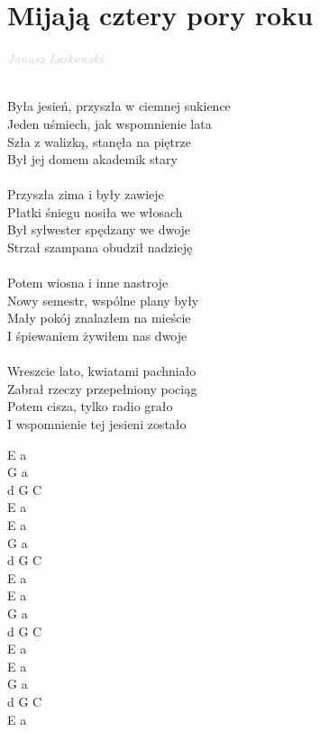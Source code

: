 \documentclass[a5paper, 10pt]{book}
\begin{document}
\newpage
\section{Mijają cztery pory roku}\textcolor{lightgray}{\textit{Janusz Laskowski}}\\~\\
\begin{minipage}[t]{0.8\textwidth}
Była jesień, przyszła w ciemnej sukience\\
Jeden uśmiech, jak wspomnienie lata\\
\hspace*{5mm}Szła z walizką, stanęła na piętrze\\
\hspace*{5mm}Był jej domem akademik stary\\
\\
Przyszła zima i były zawieje\\
Płatki śniegu nosiła we włosach\\
\hspace*{5mm}Był sylwester spędzany we dwoje\\
\hspace*{5mm}Strzał szampana obudził nadzieję\\
\\
Potem wiosna i inne nastroje\\
Nowy semestr, wspólne plany były\\
\hspace*{5mm}Mały pokój znalazłem na mieście\\
\hspace*{5mm}I śpiewaniem żywiłem nas dwoje\\
\\
Wreszcie lato, kwiatami pachniało\\
Zabrał rzeczy przepełniony pociąg\\
\hspace*{5mm}Potem cisza, tylko radio grało\\
\hspace*{5mm}I wspomnienie tej jesieni zostało\\
\end{minipage}
\begin{minipage}[t]{0.2\textwidth}
E a \\
G a \\
d G C\\
E a \\

E a \\
G a \\
d G C\\
E a \\

E a \\
G a \\
d G C\\
E a \\

E a \\
G a \\
d G C\\
E a \\
\end{minipage}
\end{document}
